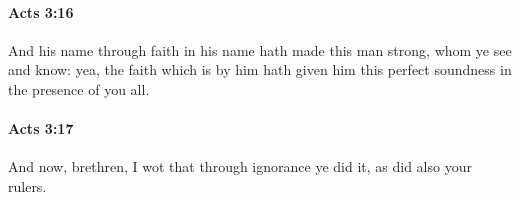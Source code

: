 		\paragraph{Acts 3:16} %
			\label{ACTS-3-16}

			And his name through faith in his name hath made this man strong, whom ye see and know: yea, the faith which is by him hath given him this perfect soundness in the presence of you all.

			\begin{framed}
			\scriptsize
				\begin{compactdesc}
					\item[SBLG] 
				\end{compactdesc}
			\end{framed}

		\paragraph{Acts 3:17} %
			\label{ACTS-3-17}

			And now, brethren, I wot that through ignorance ye did it, as did also your rulers.

